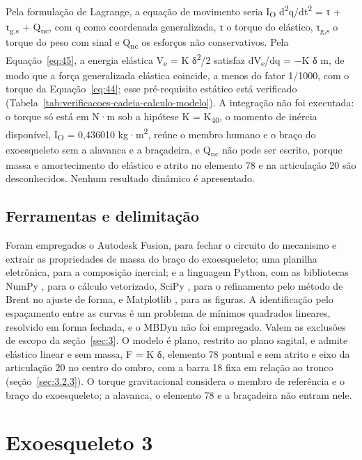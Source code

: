 Pela formulação de Lagrange, a equação de movimento seria I\textsubscript{O} d\textsuperscript{2}q/dt\textsuperscript{2} = τ + τ\textsubscript{g,s} + Q\textsubscript{nc}, com q como coordenada generalizada, τ o torque do elástico, τ\textsubscript{g,s} o torque do peso com sinal e Q\textsubscript{nc} os esforços não conservativos. Pela Equação~\eqref{eq:45}, a energia elástica V\textsubscript{e} = K δ\textsuperscript{2}/2 satisfaz dV\textsubscript{e}/dq = −K δ m, de modo que a força generalizada elástica coincide, a menos do fator 1/1000, com o torque da Equação~\eqref{eq:44}; esse pré-requisito estático está verificado (Tabela~\ref{tab:verificacoes-cadeia-calculo-modelo}). A integração não foi executada: o torque só está em N·m sob a hipótese K = K\textsubscript{40}, o momento de inércia disponível, I\textsubscript{O} = 0,436010 kg·m\textsuperscript{2}, reúne o membro humano e o braço do exoesqueleto sem a alavanca e a braçadeira, e Q\textsubscript{nc} não pode ser escrito, porque massa e amortecimento do elástico e atrito no elemento 78 e na articulação 20 são desconhecidos. Nenhum resultado dinâmico é apresentado.

\subsection{Ferramentas e delimitação}\label{sec:3.2.14}

Foram empregados o Autodesk Fusion, para fechar o circuito do mecanismo e extrair as propriedades de massa do braço do exoesqueleto; uma planilha eletrônica, para a composição inercial; e a linguagem Python, com as bibliotecas NumPy \cite{harris2020}, para o cálculo vetorizado, SciPy \cite{virtanen2020}, para o refinamento pelo método de Brent \cite{brent1973} no ajuste de forma, e Matplotlib \cite{hunter2007}, para as figuras. A identificação pelo espaçamento entre as curvas é um problema de mínimos quadrados lineares, resolvido em forma fechada, e o MBDyn não foi empregado. Valem as exclusões de escopo da seção~\ref{sec:3}. O modelo é plano, restrito ao plano sagital, e admite elástico linear e sem massa, F = K δ, elemento 78 pontual e sem atrito e eixo da articulação 20 no centro do ombro, com a barra 18 fixa em relação ao tronco (seção~\ref{sec:3.2.3}). O torque gravitacional considera o membro de referência e o braço do exoesqueleto; a alavanca, o elemento 78 e a braçadeira não entram nele.

\section{Exoesqueleto 3}\label{sec:3.3}

